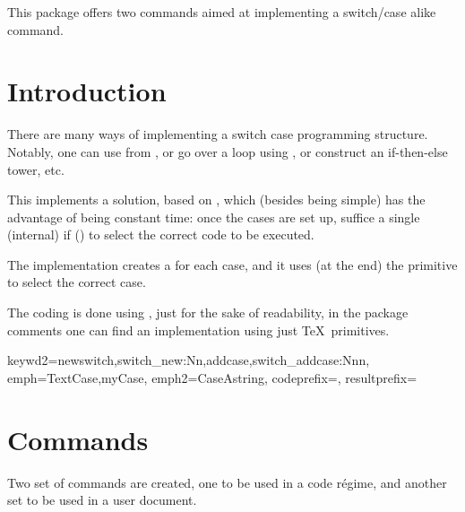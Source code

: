 \documentclass[10pt]{article}
\begin{document}
  

\begin{typesetabstract}
 
This package offers two commands aimed at implementing a switch/case alike command.
\end{typesetabstract}

\tableofcontents

\section{Introduction}
There are many ways of implementing a switch case programming structure. Notably, one can use  from , or go over a loop using \tsobj{\pdfstrcmp}, or construct an if-then-else tower, etc.

This implements a solution, based on  \cite{stackexchage:switchcase}, which (besides being simple) has the advantage of being constant time: once the cases are set up, suffice a single (internal) if (\tsobj{\ifcsname}) to select the correct code to be executed. 



\begin{tsremark}
  The implementation creates a \tsobj{\csname} for each case, and it uses (at the end) the primitive \tsobj{\ifcsname} to select the correct case.
\end{tsremark}
\begin{tsremark}
  The coding is done using , just for the sake of readability, in the package comments one can find an implementation using just \TeX\  primitives.
\end{tsremark}

  {
    keywd2={newswitch,switch_new:Nn,addcase,switch_addcase:Nnn},
    emph={TextCase,myCase},
    emph2={CaseAstring},
    codeprefix={},
    resultprefix={}
  }


\section{Commands}
Two set of commands are created, one to be used in a  code régime, and another set to be used in a user document.
\end{document}

